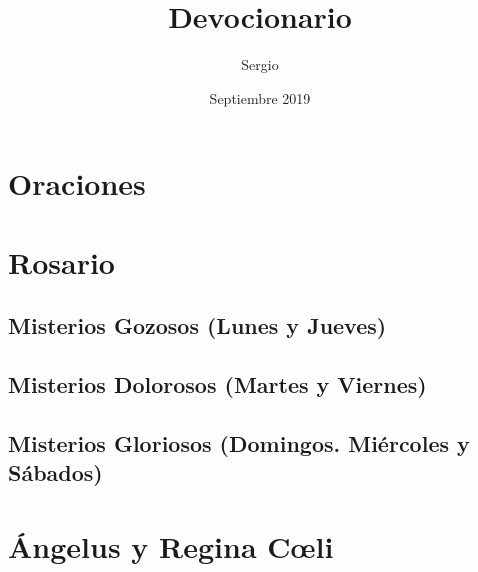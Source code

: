 \documentclass[11pt,a4paper]{report}
\title{Devocionario}
\author{Sergio}
\date{Septiembre 2019}
\begin{document}
\maketitle

\section*{Oraciones}


\section*{Rosario}
\subsection*{Misterios Gozosos (Lunes y Jueves)}

\subsection*{Misterios Dolorosos (Martes y Viernes)}

\subsection*{Misterios Gloriosos (Domingos. Miércoles y Sábados)}


\section*{Ángelus y Regina Cœli}

\end{document}
